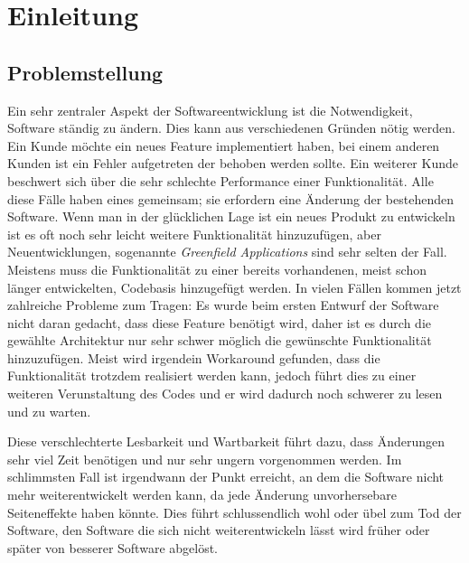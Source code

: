 \chapter{Einleitung}
\label{cha:Einleitung}

\section{Problemstellung}
\label{cha:Problemstellung}
Ein sehr zentraler Aspekt der Softwareentwicklung ist die Notwendigkeit, Software ständig zu ändern. Dies kann aus verschiedenen Gründen nötig werden. Ein Kunde möchte ein neues Feature implementiert haben, bei einem anderen Kunden ist ein Fehler aufgetreten der behoben werden sollte. Ein weiterer Kunde beschwert sich über die sehr schlechte Performance einer Funktionalität. Alle diese Fälle haben eines gemeinsam; sie erfordern eine Änderung der bestehenden Software. Wenn man in der glücklichen Lage ist ein neues Produkt zu entwickeln ist es oft noch sehr leicht weitere Funktionalität hinzuzufügen, aber Neuentwicklungen, sogenannte \textit{ Greenfield Applications} sind sehr selten der Fall. Meistens muss die Funktionalität zu einer bereits vorhandenen, meist schon länger entwickelten, Codebasis hinzugefügt werden. In vielen Fällen kommen jetzt zahlreiche Probleme zum Tragen: Es wurde beim ersten Entwurf der Software nicht daran gedacht, dass diese Feature benötigt wird, daher ist es durch die gewählte Architektur nur sehr schwer möglich die gewünschte Funktionalität hinzuzufügen. Meist wird irgendein Workaround gefunden, dass die Funktionalität trotzdem realisiert werden kann, jedoch führt dies zu einer weiteren Verunstaltung des Codes und er wird dadurch noch schwerer zu lesen und zu warten. 

Diese verschlechterte Lesbarkeit und Wartbarkeit führt dazu, dass Änderungen sehr viel Zeit benötigen und nur sehr ungern vorgenommen werden. Im schlimmsten Fall ist irgendwann der Punkt erreicht, an dem die Software nicht mehr weiterentwickelt werden kann, da jede Änderung unvorhersebare Seiteneffekte haben könnte. Dies führt schlussendlich wohl oder übel zum Tod der Software, den Software die sich nicht weiterentwickeln lässt wird früher oder später von besserer Software abgelöst. 

